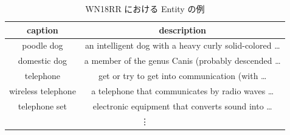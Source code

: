 \begin{table}[t]
    \centering
    \caption{WN18 から逆関係の Triple を除去する例}
    \label{example_wn18}
\end{table}

\begin{table}[t]
    \centering
    \caption{WN18RR における Entity の例}
    \label{example_Entity}
    \begin{tabular}{|cc|} \hline
      caption&description \\ \hline \hline
      poodle dog& an intelligent dog with a heavy curly solid-colored … \\ \hline
      domestic dog&a member of the genus Canis (probably descended … \\ \hline
      telephone&get or try to get into communication (with … \\ \hline
      wireless telephone&a telephone that communicates by radio waves … \\ \hline
      telephone set&electronic equipment that converts sound into … \\ \hline
      \multicolumn{2}{|c|}{\vdots} \\ \hline
    \end{tabular}
\end{table}

